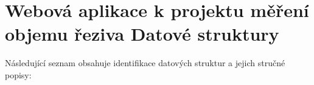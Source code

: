 \section{Webová aplikace k projektu měření objemu řeziva Datové struktury}
Následující seznam obsahuje identifikace datových struktur a jejich stručné popisy:\begin{CompactList}
\item{}
\item{}
\item{}
\item{}
\end{CompactList}
